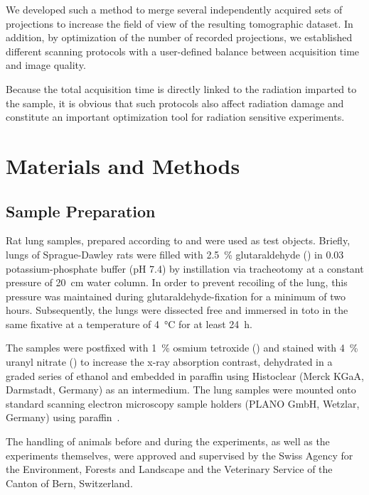 We developed such a method to merge several independently acquired sets of projections to increase the field of view of the resulting tomographic dataset. In addition, by optimization of the number of recorded projections, we established different scanning protocols with a user-defined balance between acquisition time and image quality.

Because the total acquisition time is directly linked to the radiation imparted to the sample, it is obvious that such protocols also affect radiation damage and constitute an important optimization tool for radiation sensitive experiments.

\section{Materials and Methods}\label{sec:materials and methods}
\subsection{Sample Preparation}
Rat lung samples, prepared according to \citet{Tschanz2002} and \citet{Luyet2002} were used as test objects. Briefly, lungs of Sprague-Dawley rats were filled with \SI{2.5}{\percent} glutaraldehyde () in \SI{0.03}{\Molar} potassium-phosphate buffer (pH 7.4) by instillation via tracheotomy at a constant pressure of \SI{20}{\centi\meter} water column. In order to prevent recoiling of the lung, this pressure was maintained during glutaraldehyde-fixation for a minimum of two hours. Subsequently, the lungs were dissected free and immersed in toto in the same fixative at a temperature of \SI{4}{\celsius} for at least \SI{24}{\hour}.

The samples were postfixed with \SI{1}{\percent} osmium tetroxide () and stained with \SI{4}{\percent} uranyl nitrate () to increase the x-ray absorption contrast, dehydrated in a graded series of ethanol and embedded in paraffin using Histoclear (Merck KGaA, Darmstadt, Germany) as an intermedium. The lung samples were mounted onto standard scanning electron microscopy sample holders (PLANO GmbH, Wetzlar, Germany) using paraffin~\cite{Tsuda2008}.

The handling of animals before and during the experiments, as well as the experiments themselves, were approved and supervised by the Swiss Agency for the Environment, Forests and Landscape and the Veterinary Service of the Canton of Bern, Switzerland.

